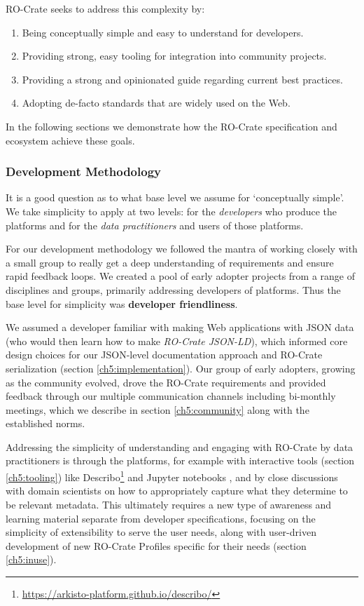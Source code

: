RO-Crate seeks to address this complexity by:

\begin{enumerate}
  \item Being conceptually simple and easy to understand for developers.
  \item Providing strong, easy tooling for integration into community projects.
  \item Providing a strong and opinionated guide regarding current best practices.
  \item Adopting de-facto standards that are widely used on the Web.
\end{enumerate}

In the following sections we demonstrate how the RO-Crate specification
and ecosystem achieve these goals.

\subsubsection{Development Methodology}\label{ch5:methodology}

It is a good question as to what base level we assume for `conceptually
simple'. We take simplicity to apply at two levels: for the
\emph{developers} who produce the platforms and for the \emph{data
practitioners} and users of those platforms.

For our development methodology we followed the mantra of working
closely with a small group to really get a deep understanding of
requirements and ensure rapid feedback loops. We created a pool of early
adopter projects from a range of disciplines and groups, primarily
addressing developers of platforms. Thus the base level for simplicity
was \textbf{developer friendliness}.

We assumed a developer familiar with making Web applications with JSON
data (who would then learn how to make \emph{RO-Crate JSON-LD}), which
informed core design choices for our JSON-level documentation approach
and RO-Crate serialization (section \vref{ch5:implementation}). Our group of early
adopters, growing as the community evolved, drove the RO-Crate
requirements and provided feedback through our multiple communication
channels including bi-monthly meetings, which we describe in section \vref{ch5:community} along with the established norms.

Addressing the simplicity of understanding and engaging with RO-Crate by
data practitioners is through the platforms, for example with
interactive tools (section \vref{ch5:tooling}) like
Describo\footnote{\url{https://arkisto-platform.github.io/describo/}} \cite{ch5-78} and
Jupyter notebooks
\cite{Kluyver 2016}, and by
close discussions with domain scientists on how to appropriately capture
what they determine to be relevant metadata. This ultimately requires a
new type of awareness and learning material separate from developer
specifications, focusing on the simplicity of extensibility to serve the
user needs, along with user-driven development of new RO-Crate Profiles
specific for their needs (section \vref{ch5:inuse}).


